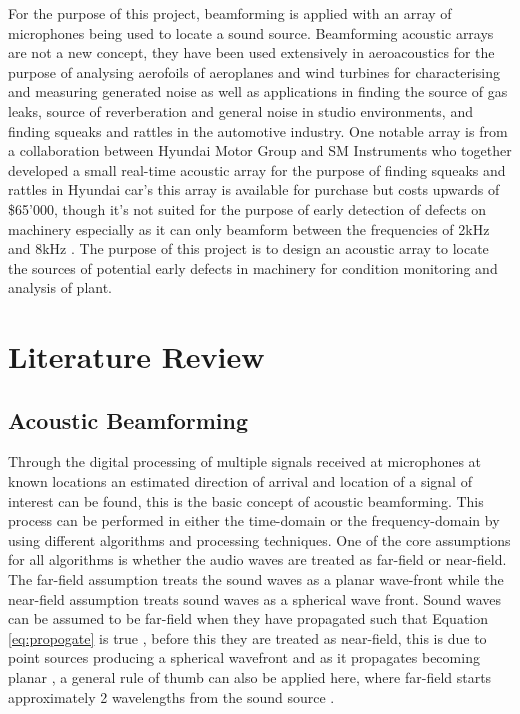 \documentclass{UoNMCHA}
\numberwithin{equation}{section}
\begin{document}
    For the purpose of this project, beamforming is applied with an array of microphones being used to locate a sound source. Beamforming acoustic arrays are not a new concept, they have been used extensively in aeroacoustics for the purpose of analysing aerofoils of aeroplanes and wind turbines for characterising and measuring generated noise as well as applications in finding the source of gas leaks, source of reverberation and general noise in studio environments, and finding squeaks and rattles in the automotive industry. One notable array is from a collaboration between Hyundai Motor Group and SM Instruments who together developed a small real-time acoustic array for the purpose of finding squeaks and rattles in Hyundai car's this array is available for purchase but costs upwards of \$65'000, though it's not suited for the purpose of early detection of defects on machinery especially as it can only beamform between the frequencies of 2kHz and 8kHz \citep{Smi}. The purpose of this project is to design an acoustic array to locate the sources of potential early defects in machinery for condition monitoring and analysis of plant.
    
\newpage
\section{Literature Review} \label{sec:Literature Review}
\subsection{Acoustic Beamforming} \label{sec:Beamforming}
    Through the digital processing of multiple signals received at microphones at known locations an estimated direction of arrival and location of a signal of interest can be found, this is the basic concept of acoustic beamforming. This process can be performed in either the time-domain or the frequency-domain by using different algorithms and processing techniques. One of the core assumptions for all algorithms is whether the audio waves are treated as far-field or near-field. The far-field assumption treats the sound waves as a planar wave-front while the near-field assumption treats sound waves as a spherical wave front. Sound waves can be assumed to be far-field when they have propagated such that Equation \ref{eq:propogate} is true \citep{McC01}, before this they are treated as near-field, this is due to point sources producing a spherical wavefront and as it propagates becoming planar \citep{Yan05}, a general rule of thumb can also be applied here, where far-field starts approximately 2 wavelengths from the sound source \citep{Mac19}. 
    
\end{document}
